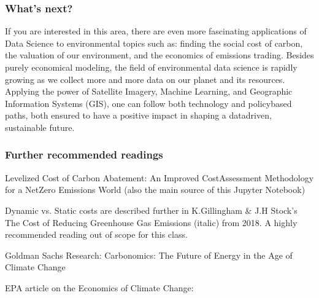 \documentclass[letterpaper,10pt,english]{jupyterBook}
\begin{document}
\subsubsection{What’s next?}
\label{\detokenize{content/12-environmental/KuznetsHypothesis-Copy1:what-s-next}}
\sphinxAtStartPar
If you are interested in this area, there are even more fascinating applications of Data Science to environmental topics such as: finding the social cost of carbon, the valuation of our environment, and the economics of emissions trading. Besides purely economical modeling, the field of environmental data science is rapidly growing as we collect more and more data on our planet and its resources. Applying the power of Satellite Imagery, Machine Learning, and Geographic Information Systems (GIS), one can follow both technology and policy\sphinxhyphen{}based paths, both ensured to have a positive impact in shaping a data\sphinxhyphen{}driven, sustainable future.


\subsubsection{Further recommended readings}
\label{\detokenize{content/12-environmental/KuznetsHypothesis-Copy1:further-recommended-readings}}
\sphinxAtStartPar
Levelized Cost of Carbon Abatement: An Improved Cost\sphinxhyphen{}Assessment Methodology for a Net\sphinxhyphen{}Zero Emissions World (also the main source of this Jupyter Notebook)

\sphinxAtStartPar
{}

\sphinxAtStartPar
Dynamic vs. Static costs are described further in K.Gillingham \& J.H Stock’s The Cost of Reducing Greenhouse Gas Emissions (italic) from 2018. \sphinxhyphen{} A highly recommended reading out of scope for this class.

\sphinxAtStartPar
{}

\sphinxAtStartPar
Goldman Sachs Research: Carbonomics: The Future of Energy in the Age of Climate Change

\sphinxAtStartPar
{}

\sphinxAtStartPar
EPA article on the Economics of Climate Change:
\end{document}
